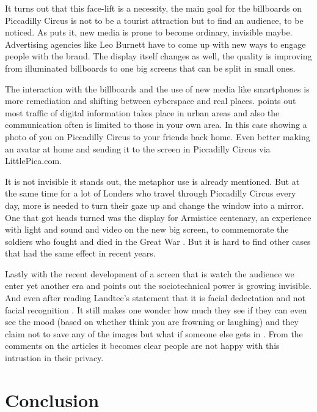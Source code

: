 \documentclass[a4paper, 11pt]{article}
\begin{document}
It turns out that this face-lift is a necessity, the main goal for the billboards on Piccadilly Circus is not to be a tourist attraction but to find an audience, to be noticed. As \cite{Graham} puts it, new media is prone to become ordinary, invisible maybe. Advertising agencies like Leo Burnett have to come up with new ways to engage people with the brand. The display itself changes as well, the quality is improving from illuminated billboards to one big screens that can be split in small ones.

The interaction with the billboards and the use of new media like smartphones is more remediation and shifting between cyberspace and real places. \cite{Graham} points out most traffic of digital information takes place in urban areas and also the communication often is limited to those in your own area. In this case showing a photo of you on Piccadilly Circus to your friends back home. Even better making an avatar at home and sending it to the screen in Piccadilly Circus via LittlePica.com. 

It is not invisible it stands out, the metaphor \cite{bolter2003} use is already mentioned. But at the same time for a lot of Londers who travel through Piccadilly Circus every day, more is needed to turn their gaze up and change the window into a mirror. One that got heads turned was the display for Armistice centenary, an experience with light and sound and video on the new big screen, to commemorate the soldiers who fought and died in the Great War \cite{drum}. But it is hard to find other cases that had the same effect in recent years.

Lastly with the recent development of a screen that is watch the audience we enter yet another era and \cite{Graham} points out the sociotechnical power is growing invisible. And even after reading Landtec's statement that it is facial dedectation and not facial recognition \citep{landtec}. It still makes one wonder how much they see if they can even see the mood (based on whether think you are frowning or laughing) and they claim not to save any of the images but what if someone else gets in \cite{landtec}. From the comments on the articles \citep{Dezeen} it becomes clear people are not happy with this intrustion in their privacy.



\section{Conclusion}
\end{document}
